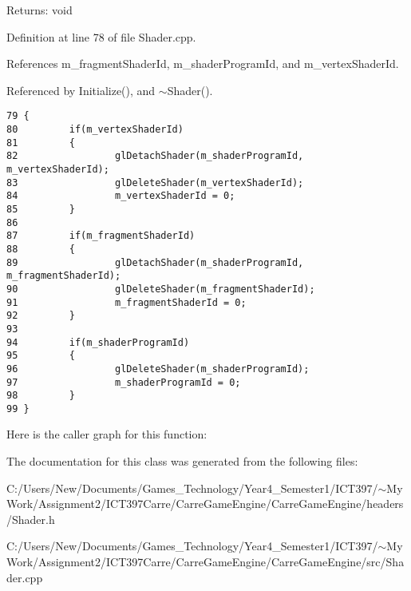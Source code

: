 \begin{Desc}
\item[Returns:]void \end{Desc}


Definition at line 78 of file Shader.cpp.

References m\_\-fragmentShaderId, m\_\-shaderProgramId, and m\_\-vertexShaderId.

Referenced by Initialize(), and $\sim$Shader().

\begin{Code}\begin{verbatim}79 {
80         if(m_vertexShaderId)
81         {
82                 glDetachShader(m_shaderProgramId, m_vertexShaderId);
83                 glDeleteShader(m_vertexShaderId);
84                 m_vertexShaderId = 0;
85         }
86 
87         if(m_fragmentShaderId)
88         {
89                 glDetachShader(m_shaderProgramId, m_fragmentShaderId);
90                 glDeleteShader(m_fragmentShaderId);
91                 m_fragmentShaderId = 0;
92         }
93 
94         if(m_shaderProgramId)
95         {
96                 glDeleteShader(m_shaderProgramId);
97                 m_shaderProgramId = 0;
98         }
99 }\end{verbatim}
\end{Code}




Here is the caller graph for this function:

The documentation for this class was generated from the following files:\begin{CompactItemize}
\item 
C:/Users/New/Documents/Games\_\-Technology/Year4\_\-Semester1/ICT397/$\sim$My Work/Assignment2/ICT397Carre/CarreGameEngine/CarreGameEngine/headers/Shader.h\item 
C:/Users/New/Documents/Games\_\-Technology/Year4\_\-Semester1/ICT397/$\sim$My Work/Assignment2/ICT397Carre/CarreGameEngine/CarreGameEngine/src/Shader.cpp\end{CompactItemize}
